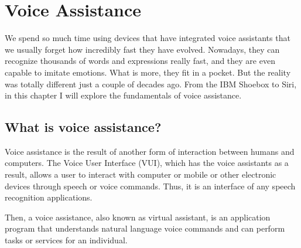 \chapter{Voice Assistance}

We spend so much time using devices that have integrated voice assistants that we usually forget how incredibly fast they have
evolved. Nowadays, they can recognize thousands of words and expressions really fast, and they are even capable to imitate
emotions. What is more, they fit in a pocket. But the reality was totally different just a couple of decades ago. From the IBM
Shoebox to Siri, in this chapter I will explore the fundamentals of voice assistance.

\section{What is voice assistance?}
Voice assistance is the result of another form of interaction between humans and computers.\cite{botsocietyVUI} The Voice User
Interface (VUI), which has the voice assistants as a result, allows a user to interact with computer or mobile or other electronic 
devices through speech or voice commands. Thus, it is an interface of any speech recognition applications.

Then, a voice assistance, also known as virtual assistant, is an application program that understands natural language voice commands
and can perform tasks or services for an individual.
